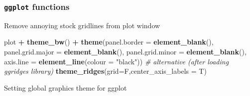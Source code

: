 \documentclass[10,portrait]{article}
\newenvironment{Shaded}{\begin{snugshade}}{\end{snugshade}}
\newcommand{\KeywordTok}[1]{\textcolor[rgb]{0.13,0.29,0.53}{\textbf{#1}}}
\newcommand{\DataTypeTok}[1]{\textcolor[rgb]{0.13,0.29,0.53}{#1}}
\newcommand{\StringTok}[1]{\textcolor[rgb]{0.31,0.60,0.02}{#1}}
\newcommand{\CommentTok}[1]{\textcolor[rgb]{0.56,0.35,0.01}{\textit{#1}}}
\newcommand{\OperatorTok}[1]{\textcolor[rgb]{0.81,0.36,0.00}{\textbf{#1}}}
\newcommand{\NormalTok}[1]{#1}
\begin{document}
\subsubsection{\texorpdfstring{\texttt{ggplot}
functions}{ggplot functions}}\label{ggplot-functions}

Remove annoying stock gridlines from plot window

\begin{Shaded}
\begin{Highlighting}[]
\NormalTok{plot }\OperatorTok{+}\StringTok{ }\KeywordTok{theme_bw}\NormalTok{() }\OperatorTok{+}\StringTok{ }
\StringTok{  }\KeywordTok{theme}\NormalTok{(}\DataTypeTok{panel.border =} \KeywordTok{element_blank}\NormalTok{(), }\DataTypeTok{panel.grid.major =} \KeywordTok{element_blank}\NormalTok{(),}
                            \DataTypeTok{panel.grid.minor =} \KeywordTok{element_blank}\NormalTok{(), }\DataTypeTok{axis.line =} \KeywordTok{element_line}\NormalTok{(}\DataTypeTok{colour =} \StringTok{"black"}\NormalTok{))}
\CommentTok{# alternative (after loading ggridges library)}
\KeywordTok{theme_ridges}\NormalTok{(}\DataTypeTok{grid=}\NormalTok{F,}\DataTypeTok{center_axis_labels =}\NormalTok{ T)}
\end{Highlighting}
\end{Shaded}

Setting global graphics theme for ggplot
\end{document}
